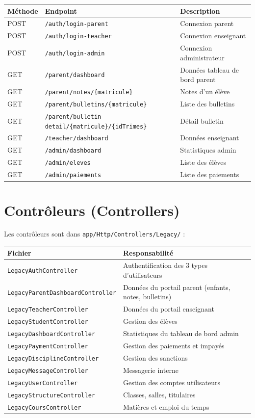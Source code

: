 \documentclass[12pt,a4paper]{report}
\begin{document}
\begin{tabularx}{\textwidth}{llX}\toprule
\textbf{Méthode} & \textbf{Endpoint} & \textbf{Description} \\\midrule
POST & \texttt{/auth/login-parent} & Connexion parent \\
POST & \texttt{/auth/login-teacher} & Connexion enseignant \\
POST & \texttt{/auth/login-admin} & Connexion administrateur \\
GET  & \texttt{/parent/dashboard} & Données tableau de bord parent \\
GET  & \texttt{/parent/notes/\{matricule\}} & Notes d'un élève \\
GET  & \texttt{/parent/bulletins/\{matricule\}} & Liste des bulletins \\
GET  & \texttt{/parent/bulletin-detail/\{matricule\}/\{idTrimes\}} & Détail bulletin \\
GET  & \texttt{/teacher/dashboard} & Données enseignant \\
GET  & \texttt{/admin/dashboard} & Statistiques admin \\
GET  & \texttt{/admin/eleves} & Liste des élèves \\
GET  & \texttt{/admin/paiements} & Liste des paiements \\
\bottomrule\end{tabularx}

\section{Contrôleurs (Controllers)}

Les contrôleurs sont dans \texttt{app/Http/Controllers/Legacy/} :

\begin{tabularx}{\textwidth}{lX}\toprule
\textbf{Fichier} & \textbf{Responsabilité} \\\midrule
\texttt{LegacyAuthController} & Authentification des 3 types d'utilisateurs \\
\texttt{LegacyParentDashboardController} & Données du portail parent (enfants, notes, bulletins) \\
\texttt{LegacyTeacherController} & Données du portail enseignant \\
\texttt{LegacyStudentController} & Gestion des élèves \\
\texttt{LegacyDashboardController} & Statistiques du tableau de bord admin \\
\texttt{LegacyPaymentController} & Gestion des paiements et impayés \\
\texttt{LegacyDisciplineController} & Gestion des sanctions \\
\texttt{LegacyMessageController} & Messagerie interne \\
\texttt{LegacyUserController} & Gestion des comptes utilisateurs \\
\texttt{LegacyStructureController} & Classes, salles, titulaires \\
\texttt{LegacyCoursController} & Matières et emploi du temps \\
\bottomrule\end{tabularx}
\end{document}
